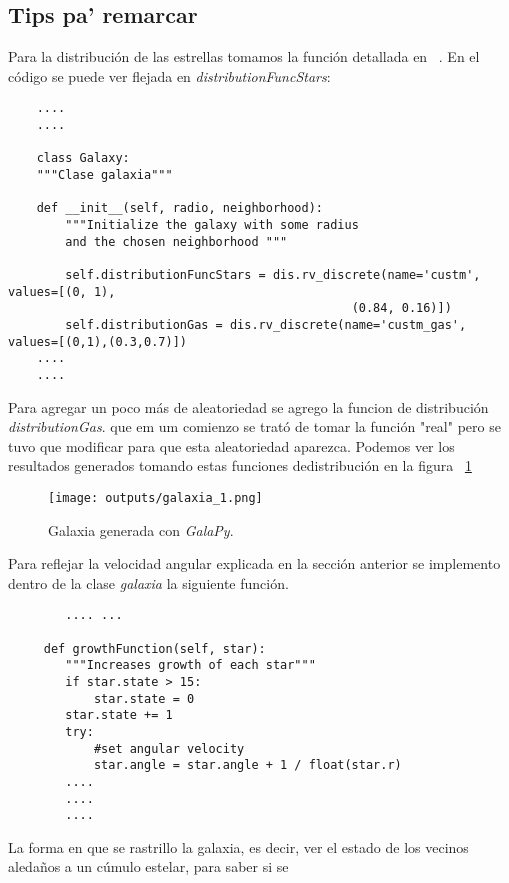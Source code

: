\documentclass[12tp]{article}
\begin{document}
\subsection{Tips pa' remarcar}
Para la distribución de las  estrellas tomamos la función detallada en ~\cite{kent}. En el código se puede ver flejada en
\emph{distributionFuncStars}:
\begin{small}
\begin{verbatim}
    ....
    ....
    
    class Galaxy:
    """Clase galaxia"""

    def __init__(self, radio, neighborhood):
        """Initialize the galaxy with some radius
        and the chosen neighborhood """

        self.distributionFuncStars = dis.rv_discrete(name='custm', values=[(0, 1),
                                                (0.84, 0.16)])
        self.distributionGas = dis.rv_discrete(name='custm_gas', values=[(0,1),(0.3,0.7)])
    ....
    ....
\end{verbatim}
\end{small}
Para agregar un poco más de aleatoriedad se agrego la funcion de distribución \emph{distributionGas}. que em um comienzo se 
trató de tomar la función "real" pero se tuvo que modificar para que esta aleatoriedad aparezca. Podemos ver los resultados
generados tomando estas funciones dedistribución en la figura ~\ref{fig:gala_1}
\begin{figure}
        \begin{center}
            \texttt{[image: outputs/galaxia\_1.png]}
        \caption{Galaxia generada con \emph{GalaPy}.}
         \label{fig:gala_1}
        \end{center}
\end{figure}
Para reflejar la velocidad angular explicada en la sección anterior se implemento dentro de la clase \emph{galaxia} la siguiente función.
\begin{small}
    \begin{verbatim}
        .... ... 
        
     def growthFunction(self, star):
        """Increases growth of each star"""
        if star.state > 15:
            star.state = 0
        star.state += 1
        try:
            #set angular velocity
            star.angle = star.angle + 1 / float(star.r)    
        ....
        ....
        ....
    \end{verbatim}
\end{small}
La forma en que se rastrillo la galaxia, es decir, ver el estado de los vecinos aledaños a un cúmulo estelar, para saber si se 
\end{document}
